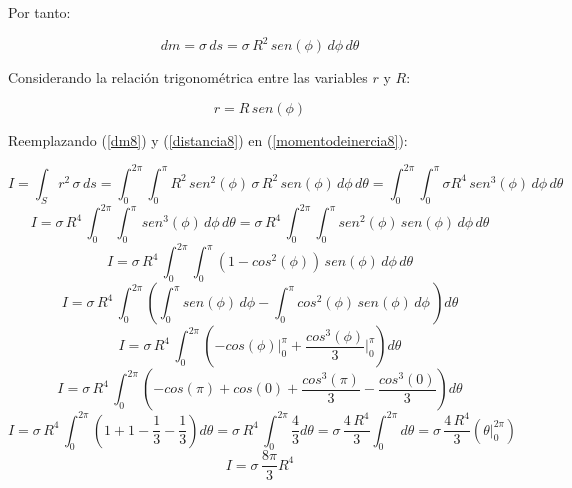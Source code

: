 \documentclass[letter,11pt]{article}
\begin{document}
Por tanto:

\begin{equation}
    dm = \sigma\, ds = \sigma\, R^2\, sen (\phi)\, d\phi\, d\theta
\label{dm8}
\end{equation}

Considerando la relación trigonométrica entre las variables $r$ y $R$:

\begin{equation}
    r = R\, sen (\phi)
\label{distancia8}
\end{equation}

Reemplazando (\ref{dm8}) y (\ref{distancia8}) en (\ref{momentodeinercia8}): 

\begin{equation*}
    I = \int_{S} r^2\, \sigma\, ds = \int_{0}^{2\pi} \int_{0}^{\pi} R^2\, sen^2(\phi)\, \sigma\, R^2\, sen (\phi)\, d\phi\, d\theta = \int_{0}^{2\pi} \int_{0}^{\pi} \sigma R^4\, sen^3(\phi)\, d\phi\, d\theta
\end{equation*}
\begin{equation*}
    I = \sigma\, R^4\, \int_{0}^{2\pi} \int_{0}^{\pi}\, sen^3(\phi)\, d\phi\, d\theta = \sigma\, R^4\, \int_{0}^{2\pi} \int_{0}^{\pi} sen^2(\phi)\, sen(\phi)\, d\phi\, d\theta
\end{equation*}
\begin{equation*}
    I = \sigma\, R^4\, \int_{0}^{2\pi} \int_{0}^{\pi} (1 - cos^2(\phi))\, sen(\phi)\, d\phi\, d\theta
\end{equation*}
\begin{equation*}
    I = \sigma\, R^4\, \int_{0}^{2\pi} \left( \int_{0}^{\pi} sen(\phi)\, d\phi - \int_{0}^{\pi} cos^2(\phi)\, sen(\phi)\, d\phi\, \right) d\theta
\end{equation*}
\begin{equation*}
    I = \sigma\, R^4\, \int_{0}^{2\pi} \left( -cos(\phi)\Biggr|_{0}^{\pi} + \frac{cos^3(\phi)}{3}\Biggr|_{0}^{\pi} \right) d\theta
\end{equation*}
\begin{equation*}
    I = \sigma\, R^4\, \int_{0}^{2\pi} \left( -cos(\pi) + cos(0) + \frac{cos^3(\pi)}{3} - \frac{cos^3(0)}{3} \right) d\theta
\end{equation*}
\begin{equation*}
    I = \sigma\, R^4\, \int_{0}^{2\pi} \left( 1 + 1 - \frac{1}{3} - \frac{1}{3} \right) d\theta = \sigma\, R^4\, \int_{0}^{2\pi} \frac{4}{3} d\theta = \sigma\, \frac{4\, R^4}{3} \int_{0}^{2\pi} d\theta = \sigma\, \frac{4\, R^4}{3} ( \theta \Biggr|_{0}^{2\pi} )
\end{equation*}
\begin{equation}
    I = \sigma\, \frac{8\pi}{3} R^4
\label{resultado8}
\end{equation}
\end{document}

